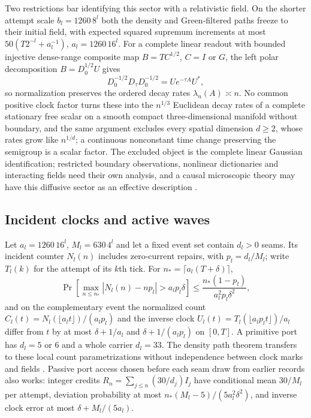 \documentclass[11pt]{article}
\theoremstyle{definition}
\theoremstyle{remark}
\theoremstyle{plain}
\begin{document}
Two restrictions bar identifying this sector with a relativistic field.
On the shorter attempt scale $b_l=1260\,8^l$ both the density and
Green-filtered paths freeze to their initial field, with expected squared
supremum increments at most $50(T2^{-l}+a_l^{-1})$, $a_l=1260\,16^l$. For a
complete linear readout with bounded injective dense-range composite map
$B=TC^{1/2}$, $C=I$ or $G$, the left polar decomposition $B=D_0^{1/2}U$ gives
\[
 D_0^{-1/2}D_\tau D_0^{-1/2}=Ue^{-\tau A}U^*,
\]
so normalization preserves the ordered decay rates $\lambda_n(A)\asymp n$.
No common positive clock factor turns these into the $n^{1/3}$ Euclidean
decay rates of a complete stationary free scalar on a smooth compact
three-dimensional manifold without boundary, and the same argument excludes
every spatial dimension $d\ge2$, whose rates grow like $n^{1/d}$; a
continuous nonconstant time change preserving the semigroup is a scalar
factor. The excluded object is the complete linear Gaussian identification;
restricted boundary observations, nonlinear dictionaries and interacting
fields need their own analysis, and a causal microscopic theory may have
this diffusive sector as an effective description \cite{nativeContinuum}.

\subsection{Incident clocks and active waves}
\label{sec:incident-clocks}

Let $a_l=1260\,16^l$, $M_l=630\,4^l$ and let a fixed event set contain
$d_l>0$ seams. Its incident counter $N_l(n)$ includes zero-current repairs,
with $p_l=d_l/M_l$; write $T_l(k)$ for the attempt of its $k$th tick. For
$n_*=\lceil a_l(T+\delta)\rceil$,
\[
 \Pr\!\left[\max_{n\le n_*}|N_l(n)-np_l|>a_lp_l\delta\right]
 \le \frac{n_*(1-p_l)}{a_l^2p_l\delta^2},
\]
and on the complementary event the normalized count
$C_l(t)=N_l(\lfloor a_lt\rfloor)/(a_lp_l)$ and the inverse clock
$U_l(t)=T_l(\lfloor a_lp_lt\rfloor)/a_l$ differ from $t$ by at most
$\delta+1/a_l$ and $\delta+1/(a_lp_l)$ on $[0,T]$. A primitive port has
$d_l=5$ or $6$ and a whole carrier $d_l=33$. The density path theorem
transfers to these local count parametrizations without independence
between clock marks and fields \cite{nativeClockLimit}. Passive port access
chosen before each seam draw from earlier records also works: integer
credits $R_n=\sum_{j\le n}(30/d_j)I_j$ have conditional mean $30/M_l$ per
attempt, deviation probability at most $n_*(M_l-5)/(5a_l^2\delta^2)$, and
inverse clock error at most $\delta+M_l/(5a_l)$.
\end{document}
